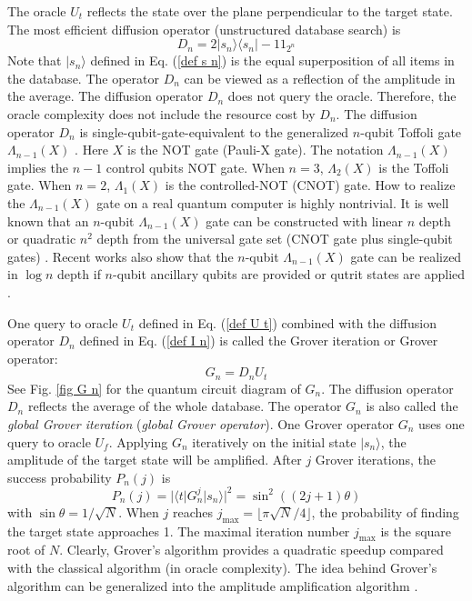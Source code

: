 \documentclass[%
 twocolumn,
 10pt,
 superscriptaddress,
 longbibliography,
 amsmath,amssymb,
 aps,
 pra,
floatfix,
]{revtex4-1}
\begin{document}
The oracle $U_t$ reflects the state over the plane perpendicular to the target state. The most efficient diffusion operator (unstructured database search) is
\begin{equation}
	\label{def I n}
	D_n = 2|s_n\rangle\langle s_n|-1\!\!1_{2^n}
\end{equation}
Note that $|s_n\rangle$ defined in Eq. (\ref{def s n}) is the equal superposition of all items in the  database. The operator $D_n$ can be viewed as a reflection of the amplitude in the average. The diffusion operator $D_n$ does not query the oracle. Therefore, the oracle complexity does not include the resource cost by $D_n$. The diffusion operator $D_n$ is single-qubit-gate-equivalent to the generalized $n$-qubit Toffoli gate $\Lambda_{n-1}(X)$ \cite{NC10}. Here $X$ is the NOT gate (Pauli-X gate). The notation $\Lambda_{n-1}(X)$ implies the $n-1$ control qubits NOT gate. When $n=3$, $\Lambda_{2}(X)$ is the Toffoli gate. When $n=2$, $\Lambda_{1}(X)$ is the controlled-NOT (CNOT) gate. How to realize the $\Lambda_{n-1}(X)$ gate on a real quantum computer is highly nontrivial. It is well known that an $n$-qubit $\Lambda_{n-1}(X)$ gate can be constructed with linear $n$ depth or quadratic $n^2$ depth from the universal gate set (CNOT gate plus single-qubit gates) \cite{BBCDMSSSW95}. Recent works also show that the $n$-qubit $\Lambda_{n-1}(X)$ gate can be realized in $\log n$ depth if $n$-qubit ancillary qubits are provided \cite{HLZWW17} or qutrit states are applied \cite{GBDBRC19}.

One query to oracle $U_t$ defined in Eq. (\ref{def U t}) combined with the diffusion operator $D_n$ defined in Eq. (\ref{def I n}) is called the Grover iteration or Grover operator:
\begin{equation}
	\label{def G n}
	G_n =  D_n U_t
\end{equation}
See Fig. \ref{fig G n} for the quantum circuit diagram of $G_n$. The diffusion operator $D_n$ reflects the average of the whole database. The operator $G_n$ is also called the {\it global Grover iteration} ({\it global Grover operator}). One Grover operator $G_n$ uses one query to oracle $U_f$. Applying $G_n$ iteratively on the initial state $|s_n\rangle$, the amplitude of the target state will be amplified. After $j$ Grover iterations, the success probability $P_n(j)$ is
\begin{equation}
	\label{def P n}
	P_n(j) = |\langle t|G_n^j|s_n\rangle|^2 = \sin^2((2j+1)\theta)
\end{equation}
with $\sin\theta=1/\sqrt N$. When $j$ reaches $j_\text{max}=\lfloor \pi\sqrt N/4\rfloor$, the probability of finding the target state approaches 1. The maximal iteration number $j_\text{max}$ is the square root of $N$. Clearly, Grover's algorithm provides a quadratic speedup compared with the classical algorithm (in oracle complexity). The idea behind Grover's algorithm can be generalized into the amplitude amplification algorithm \cite{BHMT00}.
\end{document}
